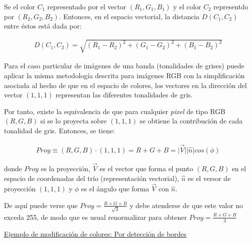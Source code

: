%
Se el color $C_{1}$ representado por el vector $(R_{1}, G_{1}, B_{1})$ y el color $C_{2}$ representdo por $(R_{2}, G_{2}, B_{2})$.
%
Entonces, en el espacio vectorial, la distancia $D (C_{1}, C_{2})$ entre \'estos est\'a dada por:

%

\begin{eqnarray}
	D(C_{1}, C_{2}) = \sqrt{ \left(R_{1} - R_{2} \right)^{2} + \left(G_{1} - G_{2} \right)^{2} + \left(B_{1} - B_{2} \right)^{2}}
\label{EqXXII}
\end{eqnarray}

Para el caso particular de im\'agenes de una banda (tonalidades de grises) puede aplicar la misma metodolog\'ia descrita para im\'agenes RGB con la
simplificaci\'on asociada al hecho de que en el espacio de colores, los vectores en la direcci\'on del vector $(1, 1, 1)$ representan
las diferentes tonalidades de gris.
%

%
Por tanto, existe la equivalencia de que para cualquier \textit{pixel} de tipo RGB $(R, G, B)$ si se lo proyecta sobre $(1, 1, 1)$ se obtiene la
contribuci\'on de cada tonalidad de gris.
%
Entonces, se tiene:

\begin{eqnarray}
	Proy \equiv (R, G, B) \cdot (1, 1, 1) =R + G + B = \lvert \vec{V} \rvert \lvert \hat{n} \rvert cos(\phi)
\label{EqXXIIb}
\end{eqnarray}

donde $Proy$ es la proyecci\;\'on, $\vec{V}$ es el vector que forma el punto $(R, G, B)$ en el espacio de coordenadas del tr\'io (representaci\'on vectorial),
$\hat{n}$ es el versor de proyecci\'on $(1, 1, 1)$ y $\phi$ es el \'angulo que forma $\vec{V}$ con $\hat{n}$.
%

%
De aqu\'i puede verse que $Proy = \frac{R + G + B}{\sqrt{3}}$ y debe atenderse de que este valor no exceda 255, de modo que es usual renormalizar para
obtener $Proy = \frac{R + G + B}{3}$

\vspace{1.0cm}


\begin{center}

\underline{Ejemplo de modificaci\'on de colores: Por detecci\'on de bordes}

\end{center}

